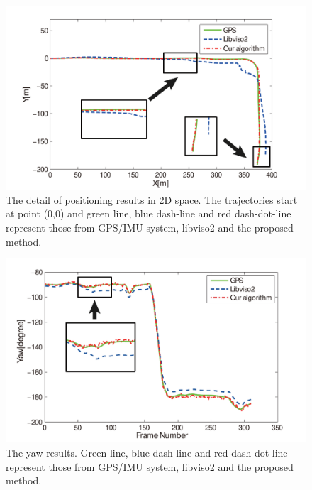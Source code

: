 \documentclass[letterpaper, 10 pt, conference]{ieeeconf}  %
\begin{document}
\begin{figure}[t]
\centering
    \includegraphics[width=1\linewidth]{source//Final//T_result.pdf}
\caption{The detail of positioning results in 2D space. The trajectories start at point (0,0) and green line, blue dash-line and red dash-dot-line represent those from GPS/IMU system, libviso2 and the proposed method.}
\label{fig:positions}
\end{figure}
\begin{figure}[t]
\centering
\includegraphics[width=0.95\linewidth]{source//Final//R_result.pdf}
\caption{The yaw results. Green line, blue dash-line and red dash-dot-line represent those from GPS/IMU system, libviso2 and the proposed method.}
\label{fig:yaw}
\end{figure}
\end{document}

